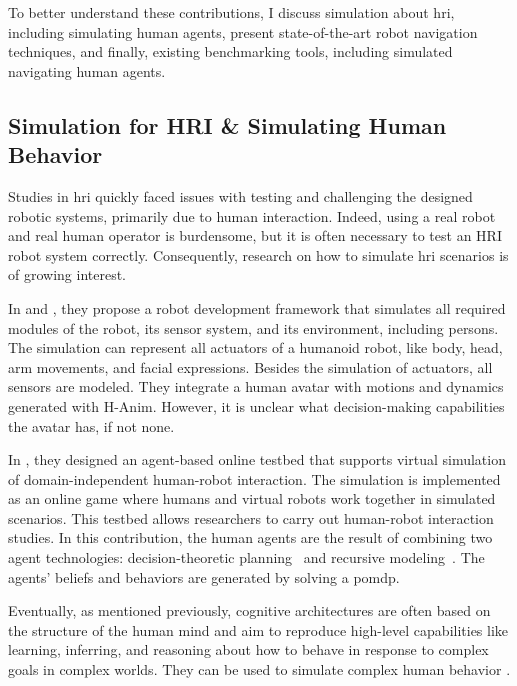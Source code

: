 To better understand these contributions, I discuss simulation about \acrshort{hri}, including simulating human agents, present state-of-the-art robot navigation techniques, and finally, existing benchmarking tools, including simulated navigating human agents. 

\subsection{Simulation for HRI \& Simulating Human Behavior}

Studies in \acrshort{hri} quickly faced issues with testing and challenging the designed robotic systems, primarily due to human interaction. Indeed, using a real robot and real human operator is burdensome, but it is often necessary to test an HRI robot system correctly. 
Consequently, research on how to 
simulate \acrshort{hri} scenarios is of growing interest. 

In \cite{schmitz_simulation_2010} and \cite{hirth_development_2011}, they propose a robot development framework that simulates all required modules of the robot, its sensor system, and its environment, including persons. The simulation can represent all actuators of a humanoid robot, like body, head, arm movements, and facial expressions. Besides the simulation of actuators, all sensors are modeled. They integrate a human avatar with motions and dynamics generated with H-Anim. However, it is unclear what decision-making capabilities the avatar has, if not none.

In \cite{shumaker_intelligent_2015}, they designed an agent-based online testbed that supports virtual simulation of domain-independent human-robot interaction. The simulation is implemented as an online game where humans and virtual robots work together in simulated scenarios. This testbed allows researchers to carry out human-robot interaction studies. In this contribution, the human agents are the result of combining two agent technologies: decision-theoretic planning~\cite{kaelbling_planning_1998} and recursive modeling~\cite{gmytrasiewicz_rigorous_1995}. The agents' beliefs and behaviors are generated by solving a \acrfull{pomdp}.

Eventually, as mentioned previously, cognitive architectures are often based on the structure of the human mind and aim to reproduce high-level capabilities like learning, inferring, and reasoning about how to behave in response to complex goals in complex worlds. They can be used to simulate complex human behavior .

